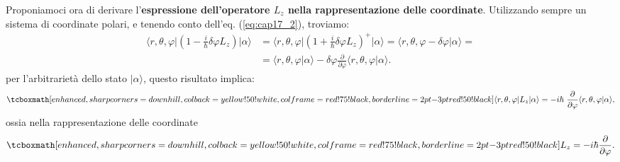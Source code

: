Proponiamoci ora di derivare l'\textbf{espressione dell'operatore $L_z$ nella rappresentazione delle coordinate}. Utilizzando sempre un sistema di coordinate polari, e tenendo conto dell'eq. (\ref{eq:cap17_2}), troviamo:
	\begin{align}
		\langle r, \theta, \varphi \vert \left(1- \frac{i}{\hbar}\delta \varphi L_z\right) \vert \alpha\rangle &= \langle r, \theta, \varphi \vert \left(1+ \frac{i}{\hbar}\delta \varphi L_z\right) ^+ \vert \alpha\rangle =  \langle r, \theta, \varphi - \delta \varphi \vert\alpha\rangle  = \nonumber \\
		&= \langle r, \theta, \varphi \vert \alpha\rangle - \delta \varphi \frac{\partial}{\partial \varphi}\langle r, \theta, \varphi \vert\alpha\rangle .
	\end{align}
per l'arbitrarietà dello stato $\vert \alpha \rangle$, questo risultato implica:
	\begin{equation}
		\tcboxmath[enhanced, sharp corners=downhill, colback=yellow!50!white, colframe=red!75!black, borderline={2pt}{-3pt}{red!50!black}]{
			\langle r, \theta, \varphi \vert  L_z \vert \alpha\rangle =- i\hbar\ \frac{\partial}{\partial \varphi}\langle r, \theta, \varphi \vert\alpha\rangle ,
			}
	\end{equation}
ossia nella rappresentazione delle coordinate
	\begin{equation}
		\tcboxmath[enhanced, sharp corners=downhill, colback=yellow!50!white, colframe=red!75!black, borderline={2pt}{-3pt}{red!50!black}]{
			L_z = -i\hbar \frac{\partial}{\partial \varphi}.
			}
	\label{eq:cap17_4}
	\end{equation}\\
	
